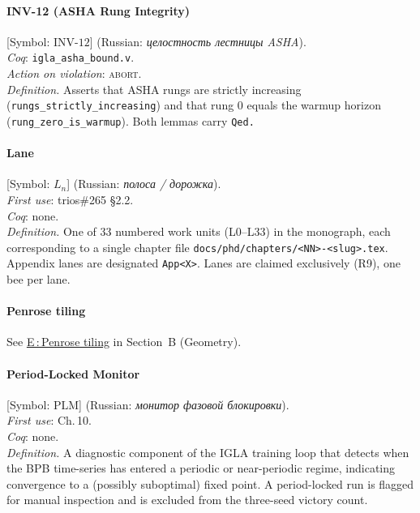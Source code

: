 \paragraph*{\textmd{\textbf{INV-12 (ASHA Rung Integrity)}}}
\label{entry:inv12}
[Symbol: $\mathrm{INV}\text{-}12$] (Russian: \textit{целостность лестницы ASHA}).\\
\textit{Coq}: \texttt{igla\_asha\_bound.v}.\\
\textit{Action on violation}: \textsc{abort}.\\
\textit{Definition.}
Asserts that ASHA rungs are strictly increasing
(\texttt{rungs\_strictly\_increasing}) and that rung 0 equals the
warmup horizon (\texttt{rung\_zero\_is\_warmup}).
Both lemmas carry \texttt{Qed.}

\paragraph*{\textmd{\textbf{Lane}}}
\label{entry:lane}
[Symbol: $L_n$] (Russian: \textit{полоса / дорожка}).\\
\textit{First use}: trios\#265 §2.2.\\
\textit{Coq}: none.\\
\textit{Definition.}
One of 33 numbered work units (L0–L33) in the monograph,
each corresponding to a single chapter file
\texttt{docs/phd/chapters/<NN>-<slug>.tex}.
Appendix lanes are designated \texttt{App<X>}.
Lanes are claimed exclusively (R9), one bee per lane.

\paragraph*{\textmd{\textbf{Penrose tiling}}}
\quad See \hyperref[entry:penrose]{E\,:\,Penrose tiling} in
Section~B (Geometry).

\paragraph*{\textmd{\textbf{Period-Locked Monitor}}}
\label{entry:plm}
[Symbol: $\mathrm{PLM}$] (Russian: \textit{монитор фазовой блокировки}).\\
\textit{First use}: Ch.\,10.\\
\textit{Coq}: none.\\
\textit{Definition.}
A diagnostic component of the IGLA training loop that detects
when the BPB time-series has entered a periodic or near-periodic
regime, indicating convergence to a (possibly suboptimal) fixed point.
A period-locked run is flagged for manual inspection and is excluded
from the three-seed victory count.

